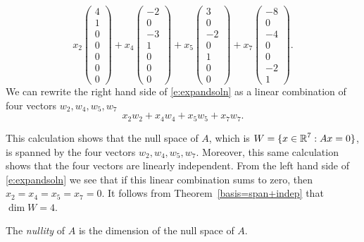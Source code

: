 \documentclass{ximera}
\begin{document}
\begin{equation*}
x_2 \left(\begin{array}{r}  4 \\ 1 \\  0 \\ 0 \\ 0 \\  0 \\ 0
\end{array} \right) +
x_4 \left(\begin{array}{r} -2 \\ 0 \\ -3 \\ 1 \\ 0 \\  0 \\ 0
\end{array} \right) +
x_5 \left(\begin{array}{r}  3 \\ 0 \\ -2 \\ 0 \\ 1 \\  0 \\ 0
\end{array} \right) +
x_7 \left(\begin{array}{r} -8 \\ 0 \\ -4 \\ 0 \\ 0 \\ -2 \\ 1
\end{array} \right).
\end{equation*}
\noindent We can rewrite the right hand side of \eqref{e:expandsoln}
as a linear combination of four
vectors $w_2,w_4,w_5,w_7$
\begin{equation}   \label{e:w'scomb}
x_2w_2 + x_4w_4 + x_5w_5 + x_7w_7.
\end{equation}

This calculation shows that the null space of $A$, which is
$W=\{x\in\mbox{$\Bbb{R}$}^7:Ax=0\}$, is spanned by the four vectors
$w_2,w_4,w_5,w_7$.  Moreover, this same calculation shows that
the four vectors  are linearly independent.
From the left hand side of \eqref{e:expandsoln} we see that if this
linear combination sums to zero, then $x_2=x_4=x_5=x_7=0$.  It
follows from Theorem~\ref{basis=span+indep} that $\dim W = 4$.

\begin{definition}  \label{D:nullity}
The {\em nullity\/} of $A$ is the dimension of the null space of $A$.
\end{definition} 
\end{document}

